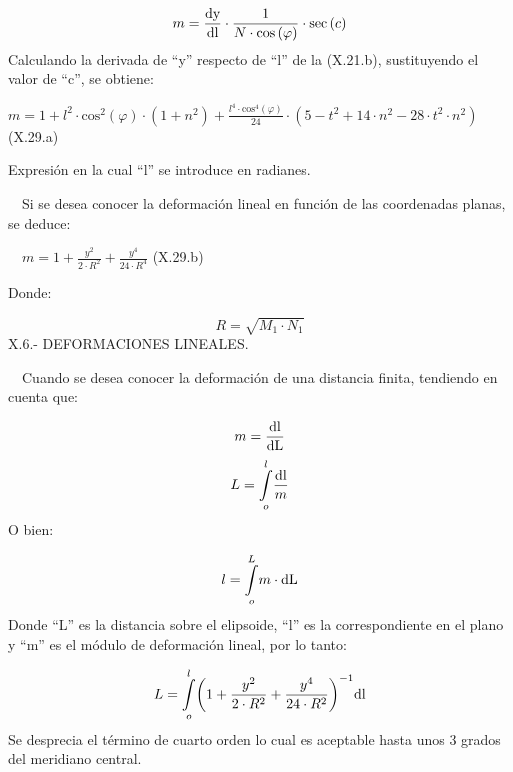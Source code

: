 \documentclass{tufte-book}
\newcommand\normalsubformula[1]{\text{\mathversion{normal}$#1$}}
\begin{document}
\begin{equation*}
{m=\frac{\normalsubformula{\text{dy}}}{\normalsubformula{\text{dl}}}\cdot
{\frac{1}{N\cdot \text{cos}\left(\varphi \right)}}\cdot
\text{sec}\left(c\right)}
\end{equation*}
Calculando la derivada de {\textquotedblleft}y{\textquotedblright}
respecto de {\textquotedblleft}l{\textquotedblright} de la (X.21.b),
sustituyendo el valor de {\textquotedblleft}c{\textquotedblright}, se
obtiene:

 ${m=1+l^{{2}}\cdot \text{cos}^{{2}}\left(\varphi \right)\cdot
\left(1+n^{{2}}\right)+\frac{l^{{4}}\cdot \text{cos}^{{4}}\left(\varphi
\right)}{\text{24}}\cdot \left(5-t^{{2}}+\text{14}\cdot
n^{{2}}-\text{28}\cdot t^{{2}}\cdot n^{{2}}\right)}$  (X.29.a)

Expresión en la cual {\textquotedblleft}l{\textquotedblright} se
introduce en radianes.

\ \ Si se desea conocer la deformación lineal en función de las
coordenadas planas, se deduce:

\ \  ${m=1+\frac{y^{{2}}}{2\cdot R^{{2}}}+\frac{y^{{4}}}{\text{24}\cdot
R^{{4}}}}$  (X.29.b)

Donde:

\begin{equation*}
{R=\sqrt{M_{{1}}\cdot N_{{1}}}}
\end{equation*}
X.6.- DEFORMACIONES LINEALES.

\ \ Cuando se desea conocer la deformación de una distancia finita,
tendiendo en cuenta que:

\begin{equation*}
{m=\frac{\normalsubformula{\text{dl}}}{\normalsubformula{\text{dL}}}}
\end{equation*}
\begin{equation*}
{L=\overset{{l}}{\underset{{o}}{\int
}}{\frac{\normalsubformula{\text{dl}}}{m}}}
\end{equation*}
O bien:

\begin{equation*}
{l=\overset{{L}}{\underset{{o}}{\int }}{m\cdot
\normalsubformula{\text{dL}}}}
\end{equation*}
Donde {\textquotedblleft}L{\textquotedblright} es la distancia sobre el
elipsoide, {\textquotedblleft}l{\textquotedblright} es la
correspondiente en el plano y {\textquotedblleft}m{\textquotedblright}
es el módulo de deformación lineal, por lo tanto:

\begin{equation*}
{L=\overset{{l}}{\underset{{o}}{\int }}{\left(1+\frac{y^{{2}}}{2\cdot
R^{{2}}}+\frac{y^{{4}}}{\text{24}\cdot
R^{{2}}}\right)}^{{-1}}\normalsubformula{\text{dl}}}
\end{equation*}
Se desprecia el término de cuarto orden lo cual es aceptable hasta
unos 3 grados del meridiano central.
\end{document}
